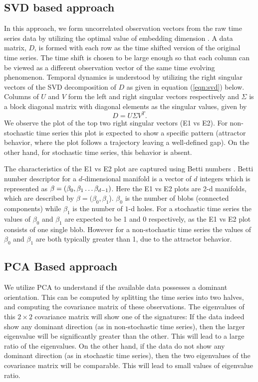 \documentclass[10pt,conference]{IEEEtran}
\begin{document}
\subsection{SVD based approach}
In this approach, we form uncorrelated observation vectors from the raw time series data by utilizing the optimal value of embedding dimension \cite{misra2006}. A data matrix, $D$, is formed with each row  as the  time shifted version of the original time series. The time shift is chosen to be large enough so that each column can be viewed as a different observation vector of the same time evolving phenomenon. Temporal dynamics is understood by utilizing the right singular vectors of the SVD decomposition of $D$ as given in equation (\ref{eqn:svd}) below. Columns of $U$ and $V$  form the left and right singular vectors respectively and $\Sigma$ is a block diagonal matrix with diagonal elements as the singular values, given by
\begin{equation}
D = U \Sigma V^T.
\label{eqn:svd}
\end{equation}
 We observe the plot of the top two right singular vectors (E1 vs E2). For non-stochastic time series this plot is expected to show a specific pattern (attractor behavior, where the plot follows a trajectory leaving a well-defined gap). On the other hand, for stochastic time series, this behavior is absent.

The characteristics of the E1 vs E2 plot are captured using Betti numbers \cite{jmlr}. Betti number descriptor for a $d$-dimensional manifold is a vector of $d$ integers which is represented as $\beta = (\beta_0, \beta_1 \mathellipsis \beta_{d-1})$. Here the E1 vs E2 plots are 2-d manifolds, which are described by  $\beta=(\beta_{0}, \beta_{1}$).  $\beta_{0}$ is the number of blobs (connected components) while $\beta_1$ is the number of $1$-d holes. For a stochastic time series the values of $\beta_{0}$  and $\beta_1$ are expected to be 1 and 0 respectively, as the E1 vs E2 plot consists of one single blob. However for a non-stochastic time series the values of $\beta_{0}$ and $\beta_1$ are both typically greater than 1, due to the attractor behavior.


\subsection{PCA Based approach}
We utilize PCA to understand if the available data possesses a dominant orientation. This can be computed by splitting the time series into two halves, and computing the covariance matrix of these observations. The eigenvalues of this $2 \times 2$ covariance matrix will show one of the signatures: If the data indeed show any dominant direction (as in non-stochastic time series), then the larger eigenvalue will be significantly greater than the other. This will lead to a large ratio of the eigenvalues. On the other hand, if the data do not show any dominant direction (as in stochastic time series), then the two eigenvalues of the covariance matrix will be comparable. This will lead to small values of eigenvalue ratio.
\end{document}
